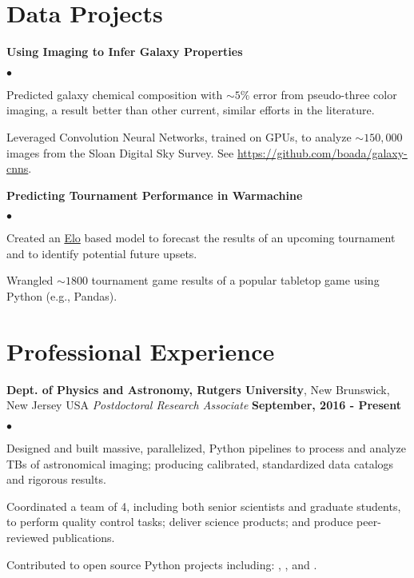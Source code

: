 \documentclass[margin,line, 11pt]{res}
\newenvironment{list2}{
  \begin{list}{$\bullet$}{%
      \setlength{\itemsep}{0in}
      \setlength{\parsep}{0in} \setlength{\parskip}{0in}
      \setlength{\topsep}{0in} \setlength{\partopsep}{0in}
      \setlength{\leftmargin}{0.2in}}}{\end{list}}
\begin{document}
\begin{resume}
\section{Data Projects}
\textbf{Using Imaging to Infer Galaxy Properties}\newline
    \begin{list2}
    	\vspace*{-5mm}
      \item Predicted galaxy chemical composition with $\sim5\%$ error from pseudo-three color imaging, a result better than other current, similar efforts in the literature.
    	\item Leveraged Convolution Neural Networks, trained on GPUs, to analyze $\sim150,000$ images from the Sloan Digital Sky Survey. See \url{https://github.com/boada/galaxy-cnns}.
    \end{list2}
    \vspace*{-4mm}
\textbf{Predicting Tournament Performance in Warmachine}\newline
    \begin{list2}
    	\vspace*{-5mm}
    	\item Created an \href{https://en.wikipedia.org/wiki/Elo_rating_system}{Elo} based model to forecast the results of an upcoming tournament and to identify potential future upsets.
    	\item Wrangled $\sim1800$ tournament game results of a popular tabletop game using Python (e.g., Pandas).
    \end{list2}
\vspace*{-2mm}

\section{Professional \newline Experience}
\textbf{Dept. of Physics and Astronomy, Rutgers University}, New Brunswick, New Jersey USA \newline
\textit{Postdoctoral Research Associate} \hfill \textbf{September, 2016 - Present}\newline
    \begin{list2}
    	\vspace*{-5mm}
    	\item Designed and built massive, parallelized, Python pipelines to process and analyze TBs of astronomical imaging; producing calibrated, standardized data catalogs and rigorous results.
    	\item Coordinated a team of 4, including both senior scientists and graduate students, to perform quality control tasks; deliver science products; and produce peer-reviewed publications.
    	\item Contributed to open source Python projects including: \href{https://github.com/boada/photometrypipeline}{}, \href{http://astlib.sourceforge.net/}{}, and \href{https://github.com/boada/easyGalaxy}{}.
    \end{list2}
\vspace*{-3mm}


\end{resume}
\end{document}
